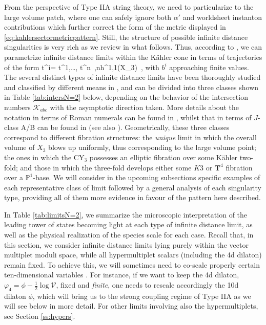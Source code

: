 From the perspective of Type IIA string theory, we need to particularize to the large volume patch, where one can safely ignore both $\alpha'$ and worldsheet instanton contributions which further correct the form of the metric displayed in \eqref{eq:kahlersectormetricpattern}. Still, the structure of possible infinite distance singularities is very rich as we review in what follows. Thus, according to \cite{Corvilain:2018lgw,Grimm:2018cpv,Grimm:2018ohb}, we can parametrize infinite distance limits within the K\"ahler cone in terms of trajectories of the form
%
\beq \label{eq:singlefieldlim}
	\lbrace t^i\rbrace = t^1,\ldots , t^{n}\to \infty\, ,\qquad n\leq h^{1,1}(X_3)\, ,
\eeq
%
with $b^i$ approaching finite values. The several distinct types of infinite distance limits have been thoroughly studied and classified by different means in \cite{Corvilain:2018lgw,Lee:2019wij}, and can be divided into three classes shown in Table \ref{tab:intersN=2} below, depending on the behavior of the intersection numbers $\mathcal{K}_{abc}$ with the asymptotic direction taken. More details about the notation in terms of Roman numerals can be found in \cite{Grimm:2018ohb}, whilst that in terms of $J$-class A/B can be found in \cite{Lee:2019wij} (see also \cite{Lee:2019tst}). Geometrically, these three classes correspond to different fibration structures: the \emph{unique} limit in which the overall volume of $X_3$ blows up uniformly, thus corresponding to the large volume point; the ones in which the CY$_3$ possesses an elliptic fibration over some K\"ahler two-fold; and those in which the three-fold develops either some $K3$ or $\mathbf{T}^4$ fibration over a $\mathbb{P}^1$-base. We will consider in the upcoming subsections specific examples of each representative class of limit followed by a general analysis of each singularity type, providing all of them more evidence in favour of the pattern here described. 
	
In Table \ref{tab:limitsN=2}, we summarize the microscopic interpretation of the leading tower of states becoming light at each type of infinite distance limit, as well as the physical realization of the species scale for each case. Recall that, in this section, we consider infinite distance limits lying purely within the vector multiplet moduli space, while all hypermultiplet scalars (including the 4d dilaton) remain fixed. To achieve this, we will sometimes need to co-scale properly certain ten-dimensional variables \cite{Lee:2019wij}. For instance, if we want to keep the 4d dilaton, $\varphi_4 =\phi-\frac{1}{2} \log \mathcal{V}$, fixed and \emph{finite}, one needs to rescale accordingly the 10d dilaton $\phi$, which will bring us to the strong coupling regime of Type IIA as we will see below in more detail. For other limits involving also the hypermultiplets, see Section \ref{ss:hypers}.

